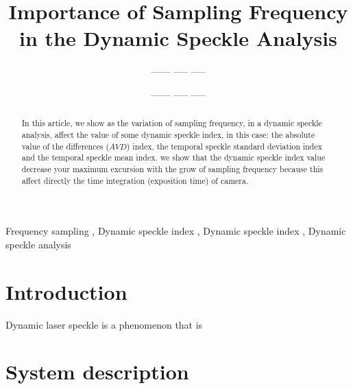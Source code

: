 \documentclass[review]{elsarticle}
\begin{document}
 

\begin{frontmatter}

\title{Importance of Sampling Frequency in the Dynamic Speckle Analysis}



\author{------ ----- -----}
\author{------ ----- -----}



\address{University Federal of Lavras, Lavras, Brazil}
% 


\begin{abstract}
In this article, we show as the variation of sampling frequency, 
in a dynamic speckle analysis, affect the value of some dynamic speckle index, 
in this case: the absolute value of the differences ($AVD$) index, the temporal 
speckle standard deviation index and the temporal 
speckle mean index.
we show that  the dynamic speckle index value decrease your maximum excursion with 
the grow of sampling frequency because this affect directly the time integration 
(exposition time) of camera.
\end{abstract}

\begin{keyword}
Frequency sampling \sep
Dynamic speckle index \sep 
Dynamic speckle index \sep 
Dynamic speckle analysis
\end{keyword}

\end{frontmatter}

\linenumbers

\section{Introduction}
Dynamic laser speckle is a phenomenon that is 
\section{System description}
\label{sec:description}
\end{document}
